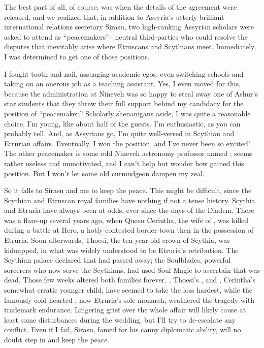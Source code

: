 \documentclass[char]{Kos}
\begin{document}
The best part of all, of course, was when the details of the agreement were released, and we realized that, in addition to Assyria's utterly brilliant international relations secretary Sirasu, two high-ranking Assyrian scholars were asked to attend as ``peacemakers''-- neutral third-parties who could resolve the disputes that inevitably arise where Etruscans and Scythians meet. Immediately, I was determined to get one of those positions.

I fought tooth and nail, assuaging academic egos, even switching schools and taking on an onerous job as a teaching assistant. Yes, I even moved for this, because the administration at Nineveh was so happy to steal away one of Ashur's star students that they threw their full support behind my candidacy for the position of ``peacemaker.'' Scholarly shenanigans aside, I was quite a reasonable choice. I'm young, like about half of the guests. I'm enthusiastic, as you can probably tell. And, as Assyrians go, I'm quite well-versed in Scythian and Etrurian affairs. Eventually, I won the position, and I've never been so excited! The other peacemaker is some odd Nineveh astronomy professor named \cAnarchist{}; \cAnarchist{\they} seems rather useless and unmotivated, and I can't help but wonder how \cAnarchist{\they} gained this position. But I won't let some old curmudgeon dampen my zeal.

So it falls to Sirasu and me to keep the peace. This might be difficult, since the Scythian and Etruscan royal families have nothing if not a tense history. Scythia and Etruria have always been at odds, ever since the days of the Diadem. There was a flare-up several years ago, when Queen Cerintha, the wife of \cEtruriaKing{\Monarch} \cEtruriaKing{}, was killed during a battle at Hero, a hotly-contested border town then in the possession of Etruria. Soon afterwards, Thoesi, the ten-year-old crown \cFugitive{\prince} of Scythia, was kidnapped, in what was widely understood to be Etruria's retribution. The Scythian palace declared that \cFugitive{} had passed away; the Soulblades, powerful sorcerers who now serve the Scythians, had used Soul Magic to ascertain that \cFugitive{\they} was dead. Those few weeks altered both families forever. \cScythiaQueen{}, Thoesi's \cScythiaQueen{\parent}, and \cPoet{}, Cerintha's somewhat erratic younger child, have seemed to take the loss hardest, while the famously cold-hearted \cEtruriaKing{}, now Etruria's sole monarch, weathered the tragedy with \cEtruriaKing{\their} trademark endurance. Lingering grief over the whole affair will likely cause at least some disturbances during the wedding, but I'll try to de-escalate any conflict. Even if I fail, Sirasu, famed for his canny diplomatic ability, will no doubt step in and keep the peace.
\end{document}
